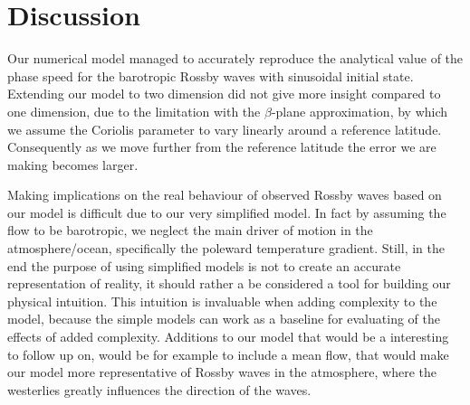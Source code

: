 \section{Discussion}

Our numerical model managed to accurately reproduce the analytical value of the
phase speed for the barotropic Rossby waves with sinusoidal initial state.
Extending our model to two dimension did not give more insight compared to
 one dimension, due to the limitation with the $\beta$-plane approximation, by
which we assume the Coriolis parameter to vary linearly around a reference
latitude. Consequently as we move further from the reference latitude the error
we are making becomes larger.

Making implications on the real behaviour of observed Rossby waves based on our
model is difficult due to our very simplified model. In fact  by assuming the
flow to be barotropic, we neglect the main driver of motion in the
atmosphere/ocean, specifically the poleward temperature gradient. Still, in the
end the purpose of using simplified models is not to create an accurate
representation of reality, it should rather a be considered a tool for building
our physical intuition. This intuition is invaluable when adding complexity to
the model, because the simple models can work as a baseline for evaluating of
the effects of added complexity. Additions to our model that would be a
interesting to follow up on, would be for example to include a mean flow, that
would make our model more representative of Rossby waves in the atmosphere,
where the westerlies greatly influences the direction of the waves.
